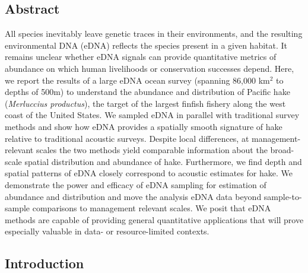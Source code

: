 \documentclass[
]{article}
\begin{document}
\hypertarget{abstract}{%
\subsection{Abstract}\label{abstract}}

All species inevitably leave genetic traces in their environments, and
the resulting environmental DNA (eDNA) reflects the species
present in a given habitat. It remains unclear whether eDNA
signals can provide quantitative metrics of abundance on which human livelihoods or conservation successes
depend. Here, we report the results of a large eDNA ocean survey 
(spanning 86,000 km\(^2\) to depths of 500m) to understand the
abundance and distribution of Pacific hake (\emph{Merluccius
productus}), the target of the largest finfish fishery along the west
coast of the United States. We sampled eDNA in parallel with traditional
 survey methods and show how eDNA provides a spatially smooth
signature of hake relative to traditional acoustic
surveys. Despite local differences, at management-relevant scales 
the two methods yield comparable information
about the broad-scale spatial distribution and abundance of hake.  Furthermore, we find depth and
spatial patterns of eDNA closely correspond to acoustic estimates for
hake. We demonstrate the power and efficacy of eDNA sampling for
estimation of abundance and distribution and move the analysis eDNA data
beyond sample-to-sample comparisons to management relevant scales. We
posit that eDNA methods are capable of providing general quantitative 
applications that will prove especially valuable in data- or resource-limited contexts.

\pagebreak

\hypertarget{introduction}{%
\subsection{Introduction}\label{introduction}}
\end{document}
